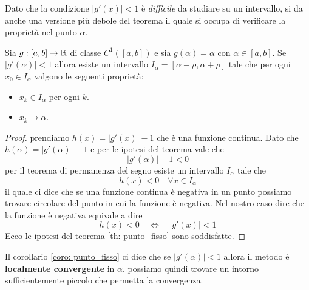 Dato che la condizione $|g'(x)| < 1$ è \emph{difficile} da studiare su un
intervallo, si da anche una versione più debole del teorema il quale si occupa
di verificare la proprietà nel punto $\alpha$.

\begin{corollary}\label{coro: punto_fisso}
	Sia $g : [a, b] \to \mathbb{R}$ di classe $C^1 ([a, b])$ e sia $g(\alpha) = \alpha$ con $\alpha \in [a,b]$. Se
	$|g'(\alpha)| < 1$ allora esiste un intervallo $I_\alpha = [\alpha - \rho, \alpha + \rho]$ tale che per
	ogni $x_0 \in I_\alpha$ valgono le seguenti proprietà:
	\begin{itemize}
		\item $x_k \in I_\alpha$ per ogni $k$.
		\item $x_k \to \alpha$.
	\end{itemize}
	\begin{proof}
		prendiamo $h(x) = |g'(x)| - 1$ che è una funzione continua. Dato che $h(\alpha) = |g'(\alpha)| - 1$ e
		per le ipotesi del teorema vale che
		\[ |g'(\alpha)| - 1 < 0 \]
		per il teorema di permanenza del segno esiste un intervallo $I_\alpha$ tale che
		\[ h(x) < 0 \quad \forall x \in I_\alpha \]
		il quale ci dice che se una funzione continua è negativa in un punto possiamo trovare circolare del punto
		in cui la funzione è negativa. Nel nostro caso dire che la funzione è negativa equivale a dire
		\[ h(x) < 0 \quad \Leftrightarrow \quad |g'(x)| < 1 \]
		Ecco le ipotesi del teorema \ref{th: punto_fisso} sono soddisfatte.
	\end{proof}
\end{corollary}

Il corollario \ref{coro: punto_fisso} ci dice che se $|g'(\alpha)| < 1$ allora il metodo è
\textbf{localmente convergente} in $\alpha$. possiamo quindi trovare un intorno sufficientemente piccolo che
permetta la convergenza.

